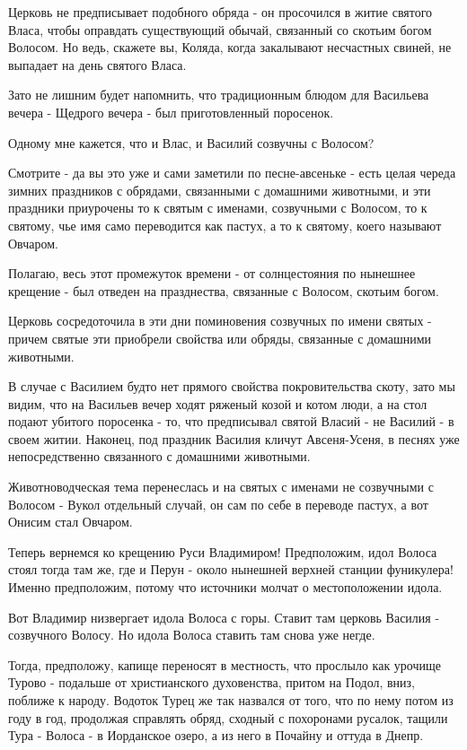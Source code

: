 \documentclass[a5paper,11pt,openany]{article}
\begin{document}
   Церковь не предписывает подобного обряда - он просочился в житие святого Власа, чтобы оправдать существующий обычай, связанный со скотьим богом Волосом. Но ведь, скажете вы, Коляда, когда закалывают несчастных свиней, не выпадает на день святого Власа.

    Зато не лишним будет напомнить, что традиционным блюдом для Васильева вечера - Щедрого вечера - был приготовленный поросенок.

   Одному мне кажется, что и Влас, и Василий созвучны с Волосом?

   Смотрите - да вы это уже и сами заметили по песне-авсеньке - есть целая череда зимних праздников с обрядами, связанными с домашними животными, и эти праздники приурочены то к святым с именами, созвучными с Волосом, то к святому, чье имя само переводится как пастух, а то к святому, коего называют Овчаром.

   Полагаю, весь этот промежуток времени - от солнцестояния по нынешнее крещение - был отведен на празднества, связанные с Волосом, скотьим богом. 

   Церковь сосредоточила в эти дни поминовения созвучных по имени святых - причем святые эти приобрели свойства или обряды, связанные с домашними животными. 

   В случае с Василием будто нет прямого свойства покровительства скоту, зато мы видим, что на Васильев вечер ходят ряженый козой и котом люди, а на стол подают убитого поросенка - то, что предписывал святой Власий - не Василий - в своем житии. Наконец, под праздник Василия кличут Авсеня-Усеня, в песнях уже непосредственно связанного с домашними животными.

    Животноводческая тема перенеслась и на святых с именами не созвучными с Волосом - Вукол отдельный случай, он сам по себе в переводе пастух, а вот Онисим стал Овчаром.

   Теперь вернемся ко крещению Руси Владимиром! Предположим, идол Волоса стоял тогда там же, где и Перун - около нынешней верхней станции фуникулера! Именно предположим, потому что источники молчат о местоположении идола.

   Вот Владимир низвергает идола Волоса с горы. Ставит там церковь Василия - созвучного Волосу. Но идола Волоса ставить там снова уже негде.

   Тогда, предположу, капище переносят в местность, что прослыло как урочище Турово - подальше от христианского духовенства, притом на Подол, вниз, поближе к народу.
Водоток Турец же так назвался от того, что по нему потом из году в год, продолжая справлять обряд, сходный с похоронами русалок, тащили Тура - Волоса - в Иорданское озеро, а из него в Почайну и оттуда в Днепр.
\end{document}
